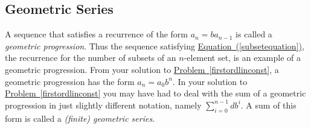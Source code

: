 \documentclass[10pt,]{book}
\theoremstyle{plain}
\theoremstyle{definition}
\numberwithin{equation}{chapter}
\begin{document}
\typeout{************************************************}
\typeout{************************************************}
\subsection[{Geometric Series}]{Geometric Series}\label{subsection-20}
A sequence that satisfies a recurrence of the form \(a_n=ba_{n-1}\) is called a \emph{geometric progression}. Thus the sequence satisfying \hyperref[subsetequation]{Equation~(\ref{subsetequation})}, the recurrence for the number of subsets of an \(n\)-element set, is an example of a geometric progression. From your solution to \hyperref[firstordlinconst]{Problem~\ref{firstordlinconst}}, a geometric progression has the form \(a_n=a_0b^n\). In your solution to \hyperref[firstordlinconst]{Problem~\ref{firstordlinconst}} you may have had to deal with the sum of a geometric progression in just slightly different notation, namely \(\sum_{i=0}^{n-1}db^i\). A sum of this form is called a \emph{(finite) geometric series}.%
\end{document}
